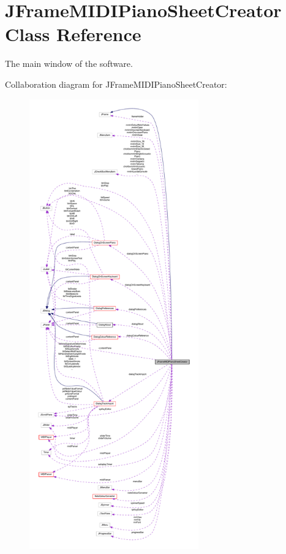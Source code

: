 \hypertarget{classcom_1_1lclion_1_1midigui_1_1_j_frame_m_i_d_i_piano_sheet_creator}{\section{J\+Frame\+M\+I\+D\+I\+Piano\+Sheet\+Creator Class Reference}
\label{classcom_1_1lclion_1_1midigui_1_1_j_frame_m_i_d_i_piano_sheet_creator}
}


The main window of the software.  




Collaboration diagram for J\+Frame\+M\+I\+D\+I\+Piano\+Sheet\+Creator\+:\nopagebreak
\begin{figure}[H]
\begin{center}
\leavevmode
\includegraphics[height=550pt]{classcom_1_1lclion_1_1midigui_1_1_j_frame_m_i_d_i_piano_sheet_creator__coll__graph}
\end{center}
\end{figure}
